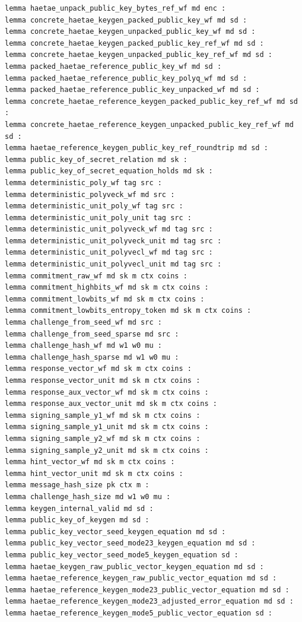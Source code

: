 \begin{lstlisting}[language=EasyCrypt,basicstyle=\ttfamily\tiny]
lemma haetae_unpack_public_key_bytes_ref_wf md enc :
lemma concrete_haetae_keygen_packed_public_key_wf md sd :
lemma concrete_haetae_keygen_unpacked_public_key_wf md sd :
lemma concrete_haetae_keygen_packed_public_key_ref_wf md sd :
lemma concrete_haetae_keygen_unpacked_public_key_ref_wf md sd :
lemma packed_haetae_reference_public_key_wf md sd :
lemma packed_haetae_reference_public_key_polyq_wf md sd :
lemma packed_haetae_reference_public_key_unpacked_wf md sd :
lemma concrete_haetae_reference_keygen_packed_public_key_ref_wf md sd :
lemma concrete_haetae_reference_keygen_unpacked_public_key_ref_wf md sd :
lemma haetae_reference_keygen_public_key_ref_roundtrip md sd :
lemma public_key_of_secret_relation md sk :
lemma public_key_of_secret_equation_holds md sk :
lemma deterministic_poly_wf tag src :
lemma deterministic_polyveck_wf md src :
lemma deterministic_unit_poly_wf tag src :
lemma deterministic_unit_poly_unit tag src :
lemma deterministic_unit_polyveck_wf md tag src :
lemma deterministic_unit_polyveck_unit md tag src :
lemma deterministic_unit_polyvecl_wf md tag src :
lemma deterministic_unit_polyvecl_unit md tag src :
lemma commitment_raw_wf md sk m ctx coins :
lemma commitment_highbits_wf md sk m ctx coins :
lemma commitment_lowbits_wf md sk m ctx coins :
lemma commitment_lowbits_entropy_token md sk m ctx coins :
lemma challenge_from_seed_wf md src :
lemma challenge_from_seed_sparse md src :
lemma challenge_hash_wf md w1 w0 mu :
lemma challenge_hash_sparse md w1 w0 mu :
lemma response_vector_wf md sk m ctx coins :
lemma response_vector_unit md sk m ctx coins :
lemma response_aux_vector_wf md sk m ctx coins :
lemma response_aux_vector_unit md sk m ctx coins :
lemma signing_sample_y1_wf md sk m ctx coins :
lemma signing_sample_y1_unit md sk m ctx coins :
lemma signing_sample_y2_wf md sk m ctx coins :
lemma signing_sample_y2_unit md sk m ctx coins :
lemma hint_vector_wf md sk m ctx coins :
lemma hint_vector_unit md sk m ctx coins :
lemma message_hash_size pk ctx m :
lemma challenge_hash_size md w1 w0 mu :
lemma keygen_internal_valid md sd :
lemma public_key_of_keygen md sd :
lemma public_key_vector_seed_keygen_equation md sd :
lemma public_key_vector_seed_mode23_keygen_equation md sd :
lemma public_key_vector_seed_mode5_keygen_equation sd :
lemma haetae_keygen_raw_public_vector_keygen_equation md sd :
lemma haetae_reference_keygen_raw_public_vector_equation md sd :
lemma haetae_reference_keygen_mode23_public_vector_equation md sd :
lemma haetae_reference_keygen_mode23_adjusted_error_equation md sd :
lemma haetae_reference_keygen_mode5_public_vector_equation sd :

\end{lstlisting}
